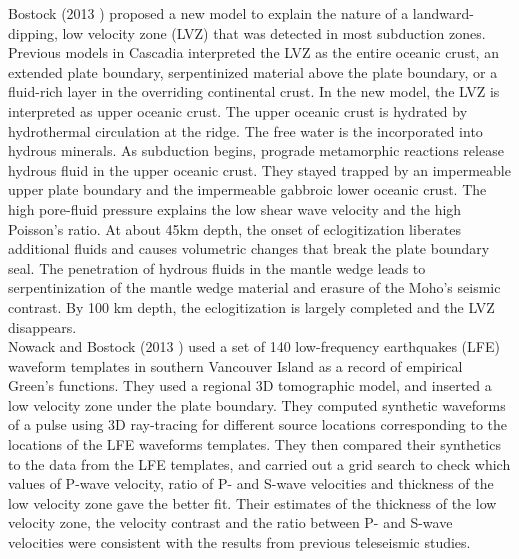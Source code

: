 \documentclass[main.tex]{subfiles}
\begin{document}
Bostock (2013 \cite{BOS_2013}) proposed a new model to explain the nature of a landward-dipping, low velocity zone (LVZ) that was detected in most subduction zones. Previous models in Cascadia interpreted the LVZ as the entire oceanic crust, an extended plate boundary, serpentinized material above the plate boundary, or a fluid-rich layer in the overriding continental crust. In the new model, the LVZ is interpreted as upper oceanic crust. The upper oceanic crust is hydrated by hydrothermal circulation at the ridge. The free water is the incorporated into hydrous minerals. As subduction begins, prograde metamorphic reactions release hydrous fluid in the upper oceanic crust. They stayed trapped by an impermeable upper plate boundary and the impermeable gabbroic lower oceanic crust. The high pore-fluid pressure explains the low shear wave velocity and the high Poisson's ratio. At about 45km depth, the onset of eclogitization liberates additional fluids and causes volumetric changes that break the plate boundary seal. The penetration of hydrous fluids in the mantle wedge leads to serpentinization of the mantle wedge material and erasure of the Moho's seismic contrast. By 100 km depth, the eclogitization is largely completed and the LVZ disappears. \\

Nowack and Bostock (2013 \cite{NOW_2013}) used a set of 140 low-frequency earthquakes (LFE) waveform templates in southern Vancouver Island as a record of empirical Green's functions. They used a regional 3D tomographic model, and inserted a low velocity zone under the plate boundary. They computed synthetic waveforms of a pulse using 3D ray-tracing for different source locations corresponding to the locations of the LFE waveforms templates. They then compared their synthetics to the data from the LFE templates, and carried out a grid search to check which values of P-wave velocity, ratio of P- and S-wave velocities and thickness of the low velocity zone gave the better fit. Their estimates of the thickness of the low velocity zone, the velocity contrast and the ratio between P- and S-wave velocities were consistent with the results from previous teleseismic studies. \\
\end{document}
